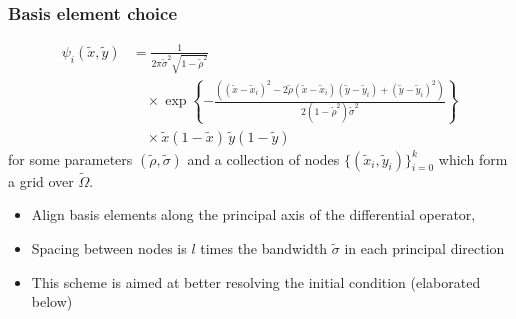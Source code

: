 \documentclass{beamer}
\begin{document}
\begin{frame}
  \frametitle{Basis element choice}
  \begin{align*}
    \psi_i(\tilde{x},\tilde{y}) &= \frac{1}{2\pi \tilde{\sigma}^2\sqrt{1-\tilde{\rho}^2} } \\
                                &\quad \times \exp\left\{ -\frac{\left( (\tilde{x} - \tilde{x}_i)^2 - 2\tilde{\rho} (\tilde{x}-\tilde{x}_i)(\tilde{y}-\tilde{y}_i) + (\tilde{y} - \tilde{y}_i)^2 \right)}{2(1-\tilde{\rho}^2)\tilde{\sigma}^2}  \right\} \nonumber \\
                                &\quad \times \tilde{x}\left(1-\tilde{x}\right)\, \tilde{y}(1-\tilde{y}) \nonumber
  \end{align*}
  for some parameters $(\tilde{\rho}, \tilde{\sigma})$ and a collection of nodes
  $\{ (\tilde{x}_i,\tilde{y}_i) \}_{i=0}^k$ which form a grid over
  $\tilde{\Omega}$.
  \begin{itemize}
  \item Align basis elements along the principal axis of the differential operator,
  \item Spacing between nodes is $l$ times the bandwidth $\tilde{\sigma}$ in each principal direction
  \item This scheme is aimed at better resolving the initial condition (elaborated below)
  \end{itemize}
\end{frame}
\end{document}
